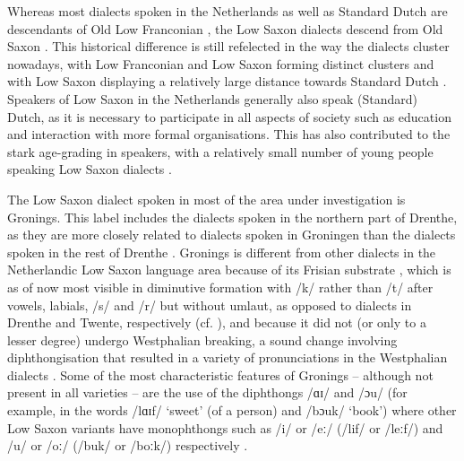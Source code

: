 \documentclass[output=paper,colorlinks,citecolor=brown,draft]{langscibook}
\begin{document}
Whereas most dialects spoken in the Netherlands as well as Standard Dutch are descendants of Old Low Franconian \citep{de_schutter_dutch_1994}, the Low Saxon dialects descend from Old Saxon \citep{bloemhoff_handboek_2008}. This historical difference is still refelected in the way the dialects cluster nowadays, with Low Franconian and Low Saxon forming  distinct clusters \citep{nerbonne_phonetic_1996} and with Low Saxon displaying a relatively large distance towards Standard Dutch \citep{wielingEtAl2011b}. Speakers of Low Saxon in the Netherlands generally also speak (Standard) Dutch, as it is necessary to participate in all aspects of society such as education and interaction with more formal organisations. This has also contributed to the stark age-grading in speakers, with a relatively small number of young people speaking Low Saxon dialects \citep{bloemhoff_taalsociologische_2008}.

The Low Saxon dialect spoken in most of the area under investigation is Gronings. This label includes the dialects spoken in the northern part of Drenthe, as they are more closely related to dialects spoken in Groningen than the dialects spoken in the rest of Drenthe \citep{bloemhoff_introduction_2020}. Gronings is different from other dialects in the Netherlandic Low Saxon language area because of its Frisian substrate \citep{reker_talige_2008}, which is as of now most visible in diminutive formation with /k/ rather than /t/ after vowels, labials, /s/ and /r/ but without umlaut, as opposed to dialects in Drenthe and Twente, respectively (cf.  \citealt{van_bree_frisian_2017}), and because it did not (or only to a lesser degree) undergo Westphalian breaking, a sound change involving diphthongisation that resulted in a variety of pronunciations in the Westphalian dialects \citep{bloemhoff_introduction_2020}. Some of the most characteristic features of Gronings -- although not present in all varieties -- are the use of the diphthongs   
/ɑɪ/ and /ɔu/ (for example, in the words /lɑɪf/ `sweet' (of a person) and /bɔuk/ `book') where other Low Saxon variants have monophthongs such as /i/ or  /eː/ (/lif/ or /leːf/) and  /u/ or /oː/ (/buk/ or /boːk/) respectively \citep{reker_talige_2008}. 
\end{document}
